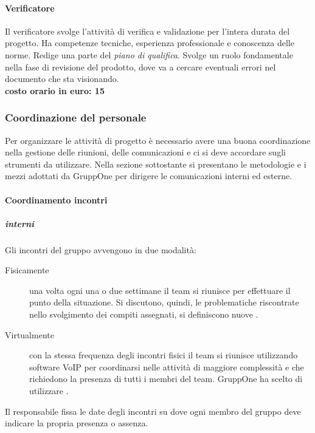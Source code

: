 \documentclass[../norme-di-progetto.tex]{subfiles}
\begin{document}
\paragraph{Verificatore}%
\label{par:verificatore}
Il verificatore svolge l'attività di verifica e validazione per l'intera durata del progetto.
Ha competenze tecniche, esperienza professionale e conoscenza delle norme. Redige una parte del \textit{piano di qualifica}.
Svolge un ruolo fondamentale nella fase di revisione del prodotto, dove va a cercare eventuali errori nel documento che sta visionando.
\\\newline\textbf{costo orario in euro: 15}

\subsubsection{Coordinazione del personale}%
\label{subs:coordinazione_del_personale}
Per organizzare le attività di progetto è necessario avere una buona coordinazione nella gestione delle riunioni, delle comunicazioni e ci si deve accordare sugli strumenti da utilizzare.
Nella sezione sottostante si presentano le metodologie e i mezzi adottati da GruppOne per dirigere le comunicazioni interni ed esterne.

\paragraph{Coordinamento incontri}%
\label{par:coordinamento_incontri}

\subparagraph{interni}%
\label{subp:coordinamento_incontri/interni}
Gli incontri del gruppo avvengono in due modalità:
\begin{description}
  \item [Fisicamente] una volta ogni una o due settimane il team si riunisce per effettuare il punto della situazione. Si discutono, quindi, le problematiche riscontrate nello svolgimento dei compiti assegnati, si definiscono nuove .
  \item [Virtualmente] con la stessa frequenza degli incontri fisici il team si riunisce utilizzando software VoIP per coordinarsi nelle attività di maggiore complessità e che richiedono la presenza di tutti i membri del team. GruppOne ha scelto di utilizzare .
\end{description}
Il responsabile fissa le date degli incontri su  dove ogni membro del gruppo deve indicare la propria presenza o assenza.
\end{document}
